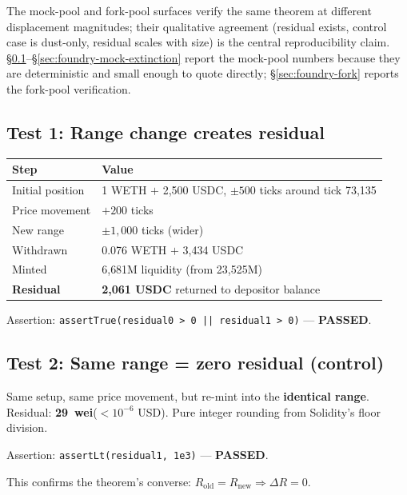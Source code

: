 \documentclass[11pt,a4paper]{article}
\begin{document}
The mock-pool and fork-pool surfaces verify the same theorem at different displacement magnitudes; their qualitative agreement (residual exists, control case is dust-only, residual scales with size) is the central reproducibility claim. \S\ref{sec:foundry-mock-residual}--\S\ref{sec:foundry-mock-extinction} report the mock-pool numbers because they are deterministic and small enough to quote directly; \S\ref{sec:foundry-fork} reports the fork-pool verification.

\subsection{Test 1: Range change creates residual}\label{sec:foundry-mock-residual}

\begin{table}[H]
\centering
\begin{tabular}{@{}ll@{}}
\toprule
Step & Value \\
\midrule
Initial position & 1 WETH $+$ 2{,}500 USDC, $\pm 500$ ticks around tick 73{,}135 \\
Price movement   & $+200$ ticks \\
New range        & $\pm 1{,}000$ ticks (wider) \\
Withdrawn        & 0.076 WETH $+$ 3{,}434 USDC \\
Minted           & 6{,}681M liquidity (from 23{,}525M) \\
\textbf{Residual} & \textbf{2{,}061 USDC} returned to depositor balance \\
\bottomrule
\end{tabular}
\end{table}

Assertion: \texttt{assertTrue(residual0 > 0 || residual1 > 0)} --- \textbf{PASSED}.

\subsection{Test 2: Same range = zero residual (control)}\label{sec:foundry-mock-control}

Same setup, same price movement, but re-mint into the \textbf{identical range}. Residual: \textbf{29~wei}\linebreak ($<\!10^{-6}$ USD). Pure integer rounding from Solidity's floor division.

Assertion: \texttt{assertLt(residual1, 1e3)} --- \textbf{PASSED}.

\noindent This confirms the theorem's converse: $R_{\text{old}} = R_{\text{new}} \Rightarrow \Delta R = 0$.
\end{document}
